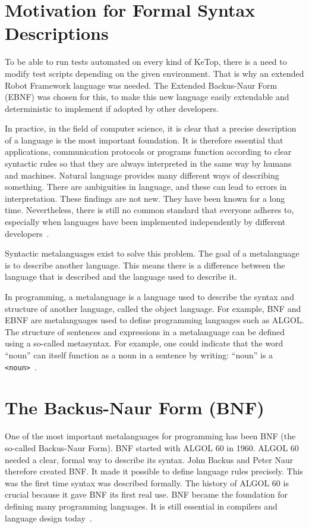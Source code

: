 
\section{Motivation for Formal Syntax Descriptions}

To be able to run tests automated on every kind of KeTop, there is a need to modify test scripts depending on the given environment. That is why an extended Robot Framework language was needed. The Extended Backus-Naur Form (EBNF) was chosen for this, to make this new language easily extendable and deterministic to implement if adopted by other developers.

In practice, in the field of computer science, it is clear that a precise description of a language is the most important foundation. It is therefore essential that applications, communication protocols or programs function according to clear syntactic rules so that they are always interpreted in the same way by humans and machines. Natural language provides many different ways of describing something. There are ambiguities in language, and these can lead to errors in interpretation. These findings are not new. They have been known for a long time. Nevertheless, there is still no common standard that everyone adheres to, especially when languages have been implemented independently by different developers~\cite[p.~V]{ISO/IEC149771996InformationBNF}.

Syntactic metalanguages exist to solve this problem. The goal of a metalanguage is to describe another language. This means there is a difference between the language that is described and the language used to describe it.

In programming, a metalanguage is a language used to describe the syntax and structure of another language, called the object language. For example, BNF and EBNF are metalanguages used to define programming languages such as ALGOL. The structure of sentences and expressions in a metalanguage can be defined using a so-called metasyntax. For example, one could indicate that the word ``noun'' can itself function as a noun in a sentence by writing: ``noun'' is a \texttt{<noun>}~\cite{WikipediaMetalanguage}.


\section{The Backus-Naur Form (BNF)}

One of the most important metalanguages for programming has been BNF (the so-called Backus-Naur Form). BNF started with ALGOL 60 in 1960. ALGOL 60 needed a clear, formal way to describe its syntax. John Backus and Peter Naur therefore created BNF. It made it possible to define language rules precisely. This was the first time syntax was described formally. The history of ALGOL 60 is crucial because it gave BNF its first real use. BNF became the foundation for defining many programming languages. It is still essential in compilers and language design today~\cite[ p.~3]{Mossenbock2025}.


